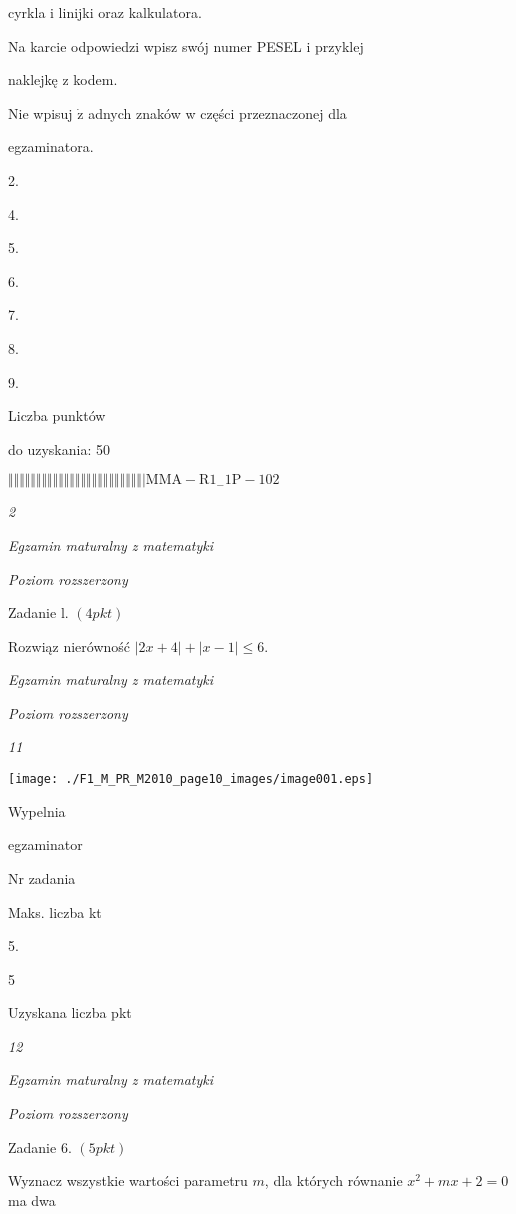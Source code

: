 \documentclass[a4paper,12pt]{article}
\begin{document}
cyrkla i linijki oraz kalkulatora.

Na karcie odpowiedzi wpisz swój numer PESEL i przyklej

naklejkę z kodem.

Nie wpisuj $\dot{\mathrm{z}}$ adnych znaków w części przeznaczonej dla

egzaminatora.

2.

4.

5.

6.

7.

8.

9.

Liczba punktów

do uzyskania: 50

$\Vert\Vert\Vert\Vert\Vert\Vert\Vert\Vert\Vert\Vert\Vert\Vert\Vert\Vert\Vert\Vert\Vert\Vert\Vert\Vert\Vert\Vert\Vert\Vert|  \mathrm{M}\mathrm{M}\mathrm{A}-\mathrm{R}1_{-}1\mathrm{P}-102$




{\it 2}

{\it Egzamin maturalny z matematyki}

{\it Poziom rozszerzony}

Zadanie l. $(4pkt)$

Rozwiąz nierówność $|2x+4|+|x-1|\leq 6.$





{\it Egzamin maturalny z matematyki}

{\it Poziom rozszerzony}

{\it 11}
\begin{center}
\texttt{[image: ./F1\_M\_PR\_M2010\_page10\_images/image001.eps]}
\end{center}
Wypelnia

egzaminator

Nr zadania

Maks. liczba kt

5.

5

Uzyskana liczba pkt





{\it 12}

{\it Egzamin maturalny z matematyki}

{\it Poziom rozszerzony}

Zadanie 6. $(5pkt)$

Wyznacz wszystkie wartości parametru $m$, dla których równanie $x^{2}+mx+2=0$ ma dwa
\end{document}
